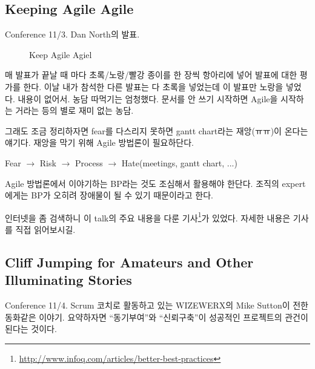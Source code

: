 \documentclass[11pt]{article}
\begin{document}
\subsection{Keeping Agile Agile}

Conference 11/3. Dan North의 발표. 

\begin{figure}[t]
    \begin{Frame}
        \begin{center}
        \end{center}
    \end{Frame}
    \caption{Keep Agile Agiel}
    \label{agile agile}
\end{figure}

매 발표가 끝날 때 마다 초록/노랑/빨강 종이를 한 장씩 항아리에 넣어
발표에 대한 평가를 한다.  이날 내가 참석한 다른 발표는 다 초록을
넣었는데 이 발표만 노랑을 넣었다.  내용이 없어서. 농담 따먹기는 엄청했다. 
문서를 안 쓰기 시작하면 Agile을 시작하는 거라는 등의 별로 재미 없는 농담.

그래도 조금 정리하자면 fear를 다스리지 못하면 gantt chart라는 재앙(ㅠㅠ)이 
온다는 얘기다. 재앙을 막기 위해 Agile 방법론이 필요하단다.

\begin{center}
Fear $\rightarrow$ Risk $\rightarrow$ Process $\rightarrow$ Hate(meetings, gantt chart, ...)
\end{center}

Agile 방법론에서 이야기하는 BP라는 것도 조심해서 활용해야 한단다. 
조직의 expert에게는 BP가 오히려 장애물이 될 수 있기 때문이라고 한다.


인터넷을 좀 검색하니 이 talk의 주요 내용을 다룬 
기사\footnote{\url{http://www.infoq.com/articles/better-best-practices}}가 
있었다. 자세한 내용은 기사를 직접 읽어보시길.

\subsection{Cliff Jumping for Amateurs and Other
  Illuminating Stories}

Conference 11/4. Scrum 코치로 활동하고 있는 WIZEWERX의 Mike Sutton이 전한 
동화같은 이야기. 요약하자면 ``동기부여''와 ``신뢰구축''이 성공적인 프로젝트의 
관건이 된다는 것이다.
 
\end{document}
